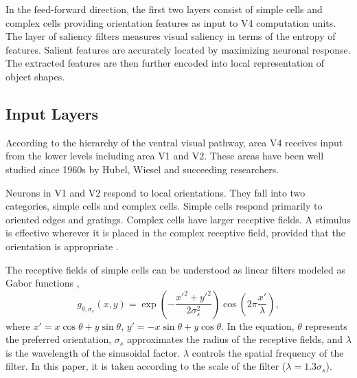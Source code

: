\documentclass[conference]{IEEEtran}
\begin{document}
In the feed-forward direction,
the first two layers consist of simple cells and complex cells
providing orientation features as input to V4 computation units.
The layer of saliency filters measures visual saliency in terms of the entropy of features.
Salient features are accurately located by maximizing neuronal response.
The extracted features are then further encoded into local representation of object shapes.

\subsection{Input Layers}

According to the hierarchy of the ventral visual pathway,
area V4 receives input from the lower levels including area V1 and V2.
These areas have been well studied since 1960s 
by Hubel, Wiesel \cite{hubel1962,hubel1965} and succeeding researchers.

Neurons in V1 and V2 respond to local orientations.
They fall into two categories, simple cells and complex cells.
Simple cells respond primarily to oriented edges and gratings.
Complex cells have larger receptive fields.
A stimulus is effective wherever it is placed in the complex receptive field, 
provided that the orientation is appropriate \cite{hubel1962}.

The receptive fields of simple cells can be understood as linear filters 
modeled as Gabor functions \cite{gabor1946},
\begin{equation}\label{equ:gabor}
g_{\theta,\sigma_s}(x,y)
=\exp \left(-\frac{x'^2+y'^2}{2\sigma_s^2}\right)
\cos \left(2\pi\frac{x'}{\lambda}\right),
\end{equation}
where $x'=x\cos\theta+y\sin\theta$, $y'=-x\sin\theta+y\cos\theta$.
In the equation, $\theta$ represents the preferred orientation,
$\sigma_s$ approximates the radius of the receptive fields,
and $\lambda$ is the wavelength of the sinusoidal factor.
$\lambda$ controls the spatial frequency of the filter.
In this paper, it is taken according to the scale of the filter
($\lambda=1.3\sigma_s$).
\end{document}
